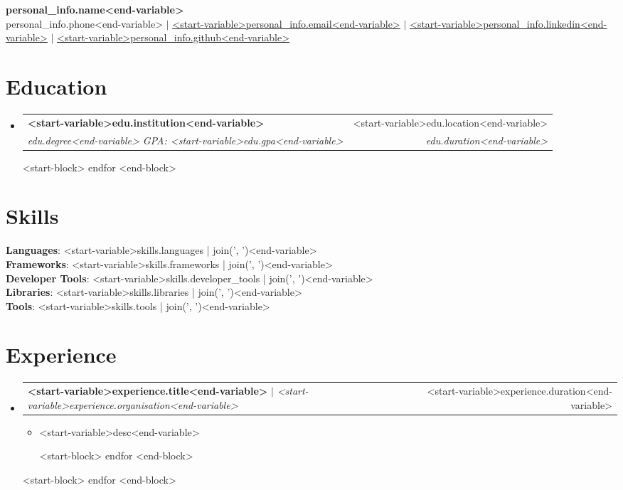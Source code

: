\documentclass[a4paper,12pt]{article}
\makeatletter
\newcommand{\resumeItem}[1]{
  \item\small{
    {#1 \vspace{-2pt}}
  }
}
\newcommand{\resumeSubheading}[4]{
  \vspace{-2pt}\item
    \begin{tabular*}{0.97\textwidth}[t]{l@{\extracolsep{\fill}}r}
      \textbf{#1} & #2 \\
      \textit{\small#3} & \textit{\small #4} \\
    \end{tabular*}\vspace{-7pt}
}
\newcommand{\resumeProjectHeading}[2]{
    \item
    \begin{tabular*}{0.97\textwidth}{l@{\extracolsep{\fill}}r}
      \small#1 & #2 \\
    \end{tabular*}\vspace{-7pt}
}
\newcommand{\resumeSubHeadingListStart}{\begin{itemize}[leftmargin=0.15in, label={}]}
\newcommand{\resumeSubHeadingListEnd}{\end{itemize}}
\newcommand{\resumeItemListStart}{\begin{itemize}}
\newcommand{\resumeItemListEnd}{\end{itemize}\vspace{-5pt}}
\makeatother
\begin{document}
\begin{center}
    \textbf{personal_info.name<end-variable>} \\ \vspace{1pt}
    personal_info.phone<end-variable> $|$ \href{mailto:<start-variable>personal_info.email<end-variable>}{\underline{<start-variable>personal_info.email<end-variable>}} $|$ 
    \href{<start-variable>personal_info.linkedin<end-variable>}{\underline{<start-variable>personal_info.linkedin<end-variable>}} $|$
    \href{<start-variable>personal_info.github<end-variable>}{\underline{<start-variable>personal_info.github<end-variable>}}
\end{center}


\section{Education}
  \resumeSubHeadingListStart
<start-block> for edu in education <end-block>
    \resumeSubheading
      {<start-variable>edu.institution<end-variable>}{<start-variable>edu.location<end-variable>}
      {<start-variable>edu.degree<end-variable> GPA: <start-variable>edu.gpa<end-variable>}{<start-variable>edu.duration<end-variable>}
<start-block> endfor <end-block>
  \resumeSubHeadingListEnd

\section{Skills}
 \begin{itemize}[leftmargin=0.15in, label={}]
    \small{\item{
     \textbf{Languages}{: <start-variable>skills.languages | join(', ')<end-variable>} \\
     \textbf{Frameworks}{: <start-variable>skills.frameworks | join(', ')<end-variable>} \\
     \textbf{Developer Tools}{: <start-variable>skills.developer_tools | join(', ')<end-variable>} \\
     \textbf{Libraries}{: <start-variable>skills.libraries | join(', ')<end-variable>} \\
     \textbf{Tools}{: <start-variable>skills.tools | join(', ')<end-variable>}
    }}
 \end{itemize}


\section{Experience}
    \resumeSubHeadingListStart
<start-block> for experience in experiences <end-block>
      \resumeProjectHeading
          {\textbf{<start-variable>experience.title<end-variable>} $|$ \emph{<start-variable>experience.organisation<end-variable>}}{<start-variable>experience.duration<end-variable>}
          \resumeItemListStart
<start-block> for desc in experience.description <end-block>
            \resumeItem{<start-variable>desc<end-variable>}
<start-block> endfor <end-block>
          \resumeItemListEnd
<start-block> endfor <end-block>
    \resumeSubHeadingListEnd
\end{document}
